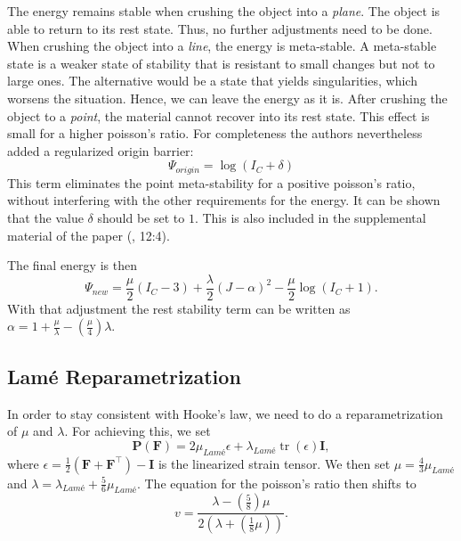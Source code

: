 The energy remains stable when crushing the object into a \textit{plane}. The object is able to return to its rest state. Thus, no further adjustments need to be done. When crushing the object into a \textit{line}, the energy is meta-stable. A meta-stable state is a weaker state of stability that is resistant to small changes but not to large ones. The alternative would be a state that yields singularities, which worsens the situation. Hence, we can leave the energy as it is. After crushing the object to a \textit{point}, the material cannot recover into its rest state. This effect is small for a higher poisson's ratio. For completeness the authors nevertheless added a regularized origin barrier:
\[
	\Psi_{origin} = \operatorname{log}(I_C +\delta)
\]
This term eliminates the point meta-stability for a positive poisson's ratio, without interfering with the other requirements for the energy. It can be shown that the value $\delta$ should be set to $1$. This is also included in the supplemental material of the paper (\cite{Smith:2018:SNF:3191713.3180491}, 12:4).

The final energy is then
\begin{equation}\label{eq:stable_energy}
\Psi_{new} = \frac{\mu}{2}\left(I_{C}-3\right) + \frac{\lambda}{2}(J-\alpha)^{2} - \frac{\mu}{2} \operatorname{log}\left(I_{C}+1\right).
\end{equation}
With that adjustment the rest stability term can be written as $\alpha=1+\frac{\mu}{\lambda}-\left(\frac{\mu}{4}\right)\lambda$.

\subsection{Lamé Reparametrization}
In order to stay consistent with Hooke's law, we need to do a reparametrization of $\mu$ and $\lambda$. For achieving this, we set
\begin{equation}
	\mathbf{P}(\mathbf{F}) = 2 \mu_{Lamé} \epsilon + \lambda_{Lamé} \operatorname{tr}(\epsilon) \mathbf{I},
\end{equation}
where $\epsilon = \frac{1}{2} (\mathbf{F} + \mathbf{F}^\intercal) - \mathbf{I}$ is the linearized strain tensor. We then set $\mu = \frac{4}{3} \mu_{Lamé}$ and $\lambda = \lambda_{Lamé} + \frac{5}{6} \mu_{Lamé}$. The equation for the poisson's ratio then shifts to 
\[
	v= \frac{\lambda - \left( \frac{5}{8} \right) \mu}{2 \left(\lambda + \left( \frac{1}{8} \mu \right) \right)}.
\]



